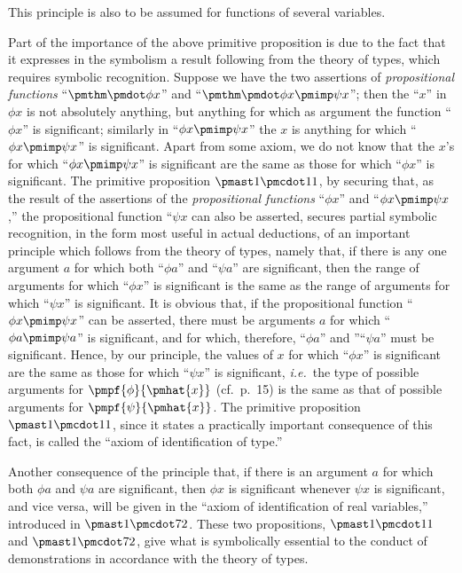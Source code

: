 This principle is also to be assumed for functions of several variables.

Part of the importance of the above primitive proposition is due to the fact that it expresses in the symbolism a result following from the theory of types, which requires symbolic recognition. Suppose we have the two assertions of \textit{propositional functions} ``$\pmthm \pmdot \phi x$'' and ``$\pmthm \pmdot \phi x \pmimp \psi x$''; then the ``$x$'' in $\phi x$ is not absolutely anything, but anything for which as argument the function ``$\phi x$'' is significant; similarly in ``$\phi x \pmimp \psi x$'' the $x$ is anything for which ``$\phi x \pmimp \psi x$'' is significant. Apart from some axiom, we do not know that the $x$'s for which ``$\phi x \pmimp \psi x$'' is significant are the same as those for which ``$\phi x$'' is significant. The  primitive proposition $\pmast1\pmcdot11$, by securing that, as the result of the assertions of the \textit{propositional functions} ``$\phi x$'' and ``$\phi x \pmimp \psi x$,'' the propositional function ``$\psi x$ can also be asserted, secures partial symbolic recognition, in the form most useful in actual deductions, of an important principle which follows from the theory of types, namely that, if there is any one argument $a$ for which both ``$\phi a$'' and ``$\psi a$'' are significant, then the range of arguments for which ``$\phi x$'' is significant is the same as the range of arguments for which ``$\psi x$'' is significant. It is obvious that, if the propositional function ``$\phi x \pmimp \psi x$'' can be asserted, there must be arguments $a$ for which ``$\phi a \pmimp \psi a$'' is significant, and for which, therefore, ``$\phi a$'' and ''``$\psi a$'' must be significant. Hence, by our principle, the values of $x$ for which ``$\phi x$'' is significant are the same as those for which ``$\psi x$'' is significant, \textit{i.e.}\ the type of possible arguments for $\pmpf{\phi}{\pmhat{x}}$ (cf.\ p.\ 15) is the same as that of possible arguments for $\pmpf{\psi}{\pmhat{x}}$. The primitive proposition $\pmast1\pmcdot11$, since it states a practically important consequence of this fact, is called the ``axiom of identification of type.''

Another consequence of the principle that, if there is an argument $a$ for which both $\phi a$ and $\psi a$ are significant, then $\phi x$ is significant whenever $\psi x$ is significant, and vice versa, will be given in the ``axiom of identification of real variables,'' introduced in $\pmast1\pmcdot72$. These two propositions, $\pmast1\pmcdot11$ and $\pmast1\pmcdot72$, give what is symbolically essential to the conduct of demonstrations in accordance with the theory of types.

